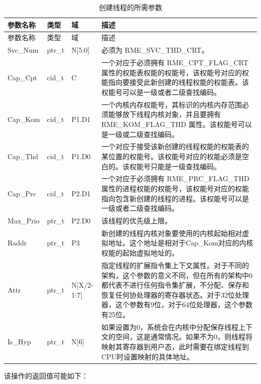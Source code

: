 \begin{xltabular}{\textwidth}{@{}>{\hsize\raggedright\arraybackslash}X>{\hsize\raggedright\arraybackslash}X>{\hsize\raggedright\arraybackslash}X>{\hsize\raggedright\arraybackslash}X@{}}
\caption{创建线程的所需参数}\label{tab:4-20-create-thread-parameters}\\
\toprule
参数名称 & 类型 & 域 & 描述\tabularnewline
\endfirsthead
\toprule
参数名称 & 类型 & 域 & 描述\tabularnewline
\midrule
\endhead
\bottomrule
\endlastfoot
Svc\_Num & ptr\_t & N{[}5:0{]} & 必须为 RME\_SVC\_THD\_CRT。\tabularnewline
Cap\_Cpt & cid\_t & C &
一个对应于必须拥有 RME\_CPT\_FLAG\_CRT 属性的权能表权能的权能号，该权能号对应的权能指向要接受此新创建的线程权能的权能表。该权能号可以是一级或者二级查找编码。\tabularnewline
Cap\_Kom & cid\_t & P1.D1 &
一个内核内存权能号，其标识的内核内存范围必须能够放下线程内核对象，并且要拥有 RME\_KOM\_FLAG\_THD 属性。该权能号可以是一级或二级查找编码。\tabularnewline
Cap\_Thd & cid\_t & P1.D0 &
一个对应于接受该新创建的线程权能的权能表的某位置的权能号。该权能号对应的权能必须是空白的。该权能号只能是一级查找编码。\tabularnewline
Cap\_Prc & cid\_t & P2.D1 &
一个对应于必须拥有 RME\_PRC\_FLAG\_THD 属性的进程权能的权能号，该权能号对应的权能指向包含新创建的线程的进程。该权能号可以是一级或者二级查找编码。\tabularnewline
Max\_Prio & ptr\_t & P2.D0 & 该线程的优先级上限。\tabularnewline
Raddr & ptr\_t & P3 &
新创建的线程内核对象要使用的内核起始相对虚拟地址。这个地址是相对于Cap\_Kom对应的内核权能的起始虚拟地址的。\tabularnewline
Attr & ptr\_t & N{[}X/2-1:7{]} &
指定线程的扩展指令集上下文属性。对于不同的架构，这个参数的意义不同，但在所有的架构中0都代表不进行任何指令集扩展，不分配、保存和恢复任何协处理器的寄存器状态。对于32位处理器，这个参数有9位，对于64位处理器，这个参数有25位。\tabularnewline
Is\_Hyp & ptr\_t & N{[}6{]} &
如果设置为0，系统会在内核中分配保存线程上下文的空间，这是通常情况。如果不为0，则线程将映射其寄存器到用户态，此时需要在绑定线程到CPU时设置映射的具体地址。\tabularnewline
\end{xltabular}

该操作的返回值可能如下：


